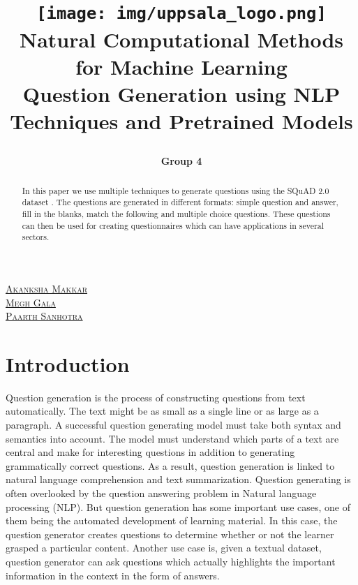 \documentclass[oneside,a4paper]{article}
\begin{document}
\fancyfoot[C]{\thepage}
\title{
\centering
 
\texttt{[image: img/uppsala\_logo.png]}\\Natural Computational Methods for Machine Learning\\[1em] \textbf{Question Generation using NLP Techniques and Pretrained Models}\\[3em]}

\author{\textbf{Group 4}}
\maketitle
\begin{center}
     \small{\href{mailto:akanksha.makkar.0073@student.uu.se}{\textsc{Akanksha Makkar}}}\\
     \small{\href{mailto:megh.gala.xxxx@student.uu.se}{\textsc{Megh Gala}}}\\
     \small{\href{mailto:paarth.sanhotra.3950@student.uu.se}{\textsc{Paarth Sanhotra}}}\\
\end{center}
\thispagestyle{empty}
\newpage
\tableofcontents

\newpage
\begin{abstract}
    In this paper we use multiple techniques to generate questions using the SQuAD 2.0 dataset \cite{rajpurkar2016squad}. The questions are generated in different formats: simple question and answer, fill in the blanks, match the following and multiple choice questions. These questions can then be used for creating questionnaires which can have applications in several sectors.
\end{abstract}
\section{Introduction}
     Question generation is the process of constructing questions from text automatically. The text might be as small as a single line or as large as a paragraph. A successful question generating model must take both syntax and semantics into account. The model must understand which parts of a text are central and make for interesting questions in addition to generating grammatically correct questions. As a result, question generation is linked to natural language comprehension and text summarization. Question generating is often overlooked by the question answering problem in Natural language processing (NLP). But question generation has some important use cases, one of them being the automated development of learning material. In this case, the question generator creates questions to determine whether or not the learner grasped a particular content. Another use case is, given a textual dataset, question generator can ask questions which actually highlights the important information in the context in the form of answers. 
     
\end{document}
